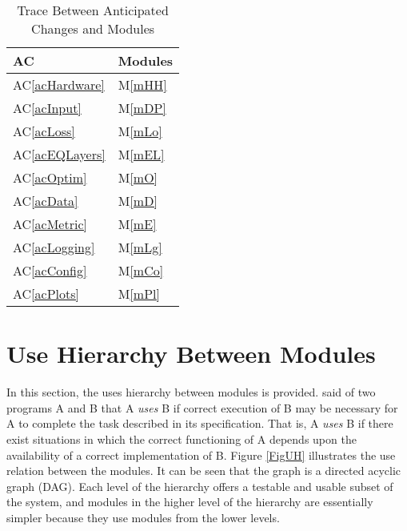 \documentclass[12pt, titlepage]{article}
\newcommand{\acref}[1]{AC\ref{#1}}
\newcommand{\mref}[1]{M\ref{#1}}
\begin{document}
\begin{table}[H]
\centering
\begin{tabular}{p{} p{}}
\toprule
\textbf{AC} & \textbf{Modules}\\
\midrule
\acref{acHardware} & \mref{mHH}\\
\acref{acInput} & \mref{mDP}\\
\acref{acLoss} & \mref{mLo}\\
\acref{acEQLayers} & \mref{mEL}\\
\acref{acOptim} & \mref{mO}\\
\acref{acData} & \mref{mD}\\
\acref{acMetric} & \mref{mE}\\
\acref{acLogging} & \mref{mLg}\\
\acref{acConfig} & \mref{mCo}\\
\acref{acPlots} & \mref{mPl}\\
\bottomrule
\end{tabular}
\caption{Trace Between Anticipated Changes and Modules}
\label{TblACT}
\end{table}

\section{Use Hierarchy Between Modules} \label{SecUse}

In this section, the uses hierarchy between modules is
provided. \citet{Parnas1978} said of two programs A and B that A {\em uses} B if
correct execution of B may be necessary for A to complete the task described in
its specification. That is, A {\em uses} B if there exist situations in which
the correct functioning of A depends upon the availability of a correct
implementation of B.  Figure \ref{FigUH} illustrates the use relation between
the modules. It can be seen that the graph is a directed acyclic graph
(DAG). Each level of the hierarchy offers a testable and usable subset of the
system, and modules in the higher level of the hierarchy are essentially simpler
because they use modules from the lower levels.
\end{document}

